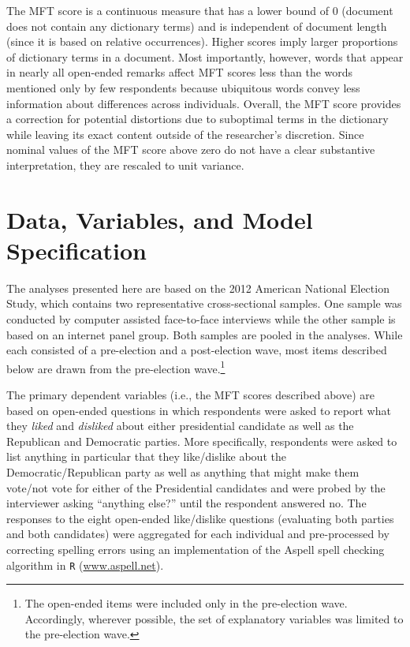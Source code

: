 \documentclass[12pt]{article}
\begin{document}
The MFT score is a continuous measure that has a lower bound of 0 (document does not contain any dictionary terms) and is independent of document length (since it is based on relative occurrences). Higher scores imply larger proportions of dictionary terms in a document. Most importantly, however, words that appear in nearly all open-ended remarks affect MFT scores less than the words mentioned only by few respondents because ubiquitous words convey less information about differences across individuals. Overall, the MFT score provides a correction for potential distortions due to suboptimal terms in the dictionary while leaving its exact content outside of the researcher's discretion. Since nominal values of the MFT score above zero do not have a clear substantive interpretation, they are rescaled to unit variance.



\section*{Data, Variables, and Model Specification}

The analyses presented here are based on the 2012 American National Election Study, which contains two representative cross-sectional samples. One sample was conducted by computer assisted face-to-face interviews while the other sample is based on an internet panel group. Both samples are pooled in the analyses. While each consisted of a pre-election and a post-election wave, most items described below are drawn from the pre-election wave.\footnote{The open-ended items were included only in the pre-election wave. Accordingly, wherever possible, the set of explanatory variables was limited to the pre-election wave.}

The primary dependent variables (i.e., the MFT scores described above) are based on open-ended questions in which respondents were asked to report what they \textit{liked} and \textit{disliked} about either presidential candidate as well as the Republican and Democratic parties. More specifically, respondents were asked to list anything in particular that they like/dislike about the Democratic/Republican party as well as anything that might make them vote/not vote for either of the Presidential candidates and were probed by the interviewer asking ``anything else?'' until the respondent answered no. The responses to the eight open-ended like/dislike questions (evaluating both parties and both candidates) were aggregated for each individual and pre-processed by correcting spelling errors using an implementation of the Aspell spell checking algorithm in \texttt{R} (\url{www.aspell.net}).
\end{document}
